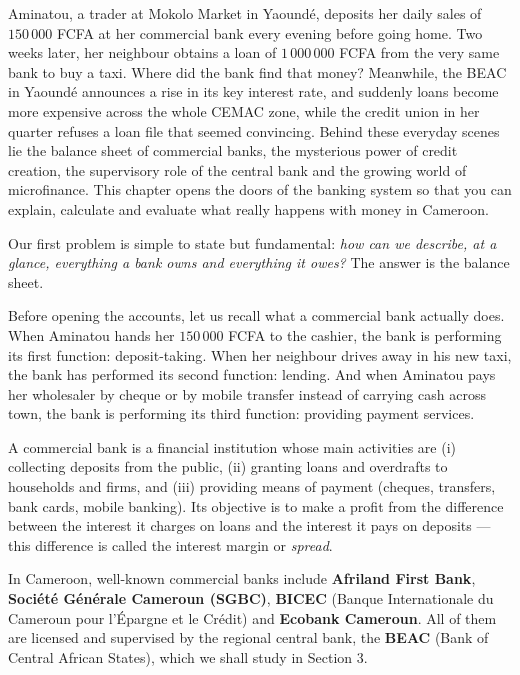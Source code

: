 \documentclass[11pt]{article}
\newcommand{\cle}[1]{{\popxbold\color{popdark}#1}}
\newcounter{popsec}
\newcounter{popsub}
\newcommand{\courssub}[1]{%
  \stepcounter{popsub}%
  \par\vspace{9pt}\noindent{\popxbold\fontsize{11.5}{13}\selectfont\color{popink}{\color{poporange}\thepopsec.\thepopsub}\hspace{6pt}#1}\par\nopagebreak\vspace{4pt}
}
\begin{document}
Aminatou, a trader at Mokolo Market in Yaoundé, deposits her daily sales of $150\,000$ FCFA at her commercial bank every evening before going home. Two weeks later, her neighbour obtains a loan of $1\,000\,000$ FCFA from the very same bank to buy a taxi. Where did the bank find that money? Meanwhile, the BEAC in Yaoundé announces a rise in its key interest rate, and suddenly loans become more expensive across the whole CEMAC zone, while the credit union in her quarter refuses a loan file that seemed convincing. Behind these everyday scenes lie the \cle{balance sheet} of commercial banks, the mysterious power of credit creation, the supervisory role of the central bank and the growing world of microfinance. This chapter opens the doors of the banking system so that you can explain, calculate and evaluate what really happens with money in Cameroon.

Our first problem is simple to state but fundamental: \emph{how can we describe, at a glance, everything a bank owns and everything it owes?} The answer is the balance sheet.

\courssub{Recall: What Is a Commercial Bank?}

Before opening the accounts, let us recall what a commercial bank actually does. When Aminatou hands her $150\,000$ FCFA to the cashier, the bank is performing its first function: \cle{deposit-taking}. When her neighbour drives away in his new taxi, the bank has performed its second function: \cle{lending}. And when Aminatou pays her wholesaler by cheque or by mobile transfer instead of carrying cash across town, the bank is performing its third function: providing \cle{payment services}.

\begin{definition}
A \cle{commercial bank} is a financial institution whose main activities are (i) collecting deposits from the public, (ii) granting loans and overdrafts to households and firms, and (iii) providing means of payment (cheques, transfers, bank cards, mobile banking). Its objective is to make a profit from the difference between the interest it charges on loans and the interest it pays on deposits — this difference is called the \cle{interest margin} or \emph{spread}.
\end{definition}

In Cameroon, well-known commercial banks include \textbf{Afriland First Bank}, \textbf{Société Générale Cameroun (SGBC)}, \textbf{BICEC} (Banque Internationale du Cameroun pour l'Épargne et le Crédit) and \textbf{Ecobank Cameroun}. All of them are licensed and supervised by the regional central bank, the \textbf{BEAC} (Bank of Central African States), which we shall study in Section 3.
\end{document}
